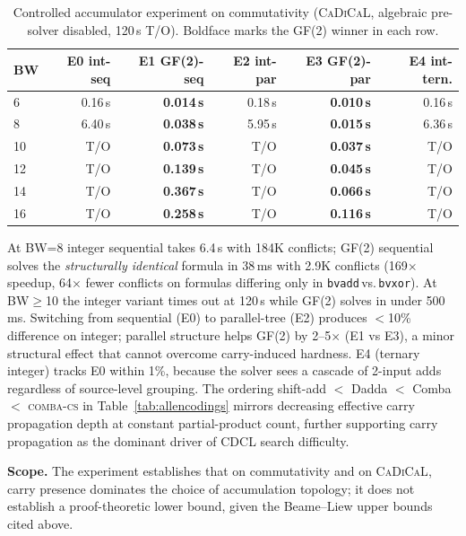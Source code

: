 \documentclass[a4paper]{ceurart}
\newcommand{\combacs}{\textsc{comba-cs}\xspace}
\newcommand{\cadical}{\textsc{CaDiCaL}\xspace}
\begin{document}
\begin{table}[ht]
\caption{Controlled accumulator experiment on commutativity
  (\cadical, algebraic pre-solver disabled, 120\,s T/O).
  Boldface marks the GF(2) winner in each row.}
\label{tab:n2}
\centering
\small
\begin{tabular}{lrrrrr}
\toprule
BW & E0 int-seq & E1 GF(2)-seq & E2 int-par & E3 GF(2)-par & E4 int-tern. \\
\midrule
6  & 0.16\,s  & \textbf{0.014\,s} & 0.18\,s & \textbf{0.010\,s} & 0.16\,s \\
8  & 6.40\,s  & \textbf{0.038\,s} & 5.95\,s & \textbf{0.015\,s} & 6.36\,s \\
10 & T/O      & \textbf{0.073\,s} & T/O     & \textbf{0.037\,s} & T/O \\
12 & T/O      & \textbf{0.139\,s} & T/O     & \textbf{0.045\,s} & T/O \\
14 & T/O      & \textbf{0.367\,s} & T/O     & \textbf{0.066\,s} & T/O \\
16 & T/O      & \textbf{0.258\,s} & T/O     & \textbf{0.116\,s} & T/O \\
\bottomrule
\end{tabular}
\end{table}

At BW=8 integer sequential takes 6.4\,s with 184K conflicts; GF(2)
sequential solves the \emph{structurally identical} formula in
38\,ms with 2.9K conflicts (169$\times$ speedup, 64$\times$
fewer conflicts on formulas differing only in
\texttt{bvadd}\,vs.\,\texttt{bvxor}). At BW$\geq$10 the integer
variant times out at 120\,s while GF(2) solves in under 500\,ms.
Switching from sequential (E0) to parallel-tree (E2) produces
${<}$10\% difference on integer; parallel structure helps GF(2) by
2--5$\times$ (E1 vs E3), a minor structural effect that cannot
overcome carry-induced hardness. E4 (ternary integer) tracks E0
within 1\%, because the solver sees a cascade of 2-input adds
regardless of source-level grouping. The ordering shift-add $<$
Dadda $<$ Comba $<$ \combacs in Table~\ref{tab:allencodings}
mirrors decreasing effective carry propagation depth at constant
partial-product count, further supporting carry propagation as the
dominant driver of CDCL search difficulty.

\textbf{Scope.} The experiment establishes that on commutativity
and on \cadical, carry presence dominates the choice of
accumulation topology; it does not establish a proof-theoretic
lower bound, given the Beame--Liew upper bounds cited above.
\end{document}
